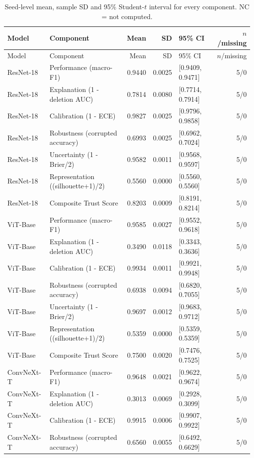 \begin{longtable}{llrrlr}
\caption{Seed-level mean, sample SD and 95\% Student-$t$ interval for every component. NC = not computed.}\label{tab:ci}\\
\toprule Model & Component & Mean & SD & 95\% CI & $n$/missing \\
\midrule\endfirsthead
\toprule Model & Component & Mean & SD & 95\% CI & $n$/missing \\
\midrule\endhead
ResNet-18 & Performance (macro-F1) & 0.9440 & 0.0025 & [0.9409, 0.9471] & 5/0 \\
ResNet-18 & Explanation (1 - deletion AUC) & 0.7814 & 0.0080 & [0.7714, 0.7914] & 5/0 \\
ResNet-18 & Calibration (1 - ECE) & 0.9827 & 0.0025 & [0.9796, 0.9858] & 5/0 \\
ResNet-18 & Robustness (corrupted accuracy) & 0.6993 & 0.0025 & [0.6962, 0.7024] & 5/0 \\
ResNet-18 & Uncertainty (1 - Brier/2) & 0.9582 & 0.0011 & [0.9568, 0.9597] & 5/0 \\
ResNet-18 & Representation ((silhouette+1)/2) & 0.5560 & 0.0000 & [0.5560, 0.5560] & 5/0 \\
ResNet-18 & Composite Trust Score & 0.8203 & 0.0009 & [0.8191, 0.8214] & 5/0 \\
ViT-Base & Performance (macro-F1) & 0.9585 & 0.0027 & [0.9552, 0.9618] & 5/0 \\
ViT-Base & Explanation (1 - deletion AUC) & 0.3490 & 0.0118 & [0.3343, 0.3636] & 5/0 \\
ViT-Base & Calibration (1 - ECE) & 0.9934 & 0.0011 & [0.9921, 0.9948] & 5/0 \\
ViT-Base & Robustness (corrupted accuracy) & 0.6938 & 0.0094 & [0.6820, 0.7055] & 5/0 \\
ViT-Base & Uncertainty (1 - Brier/2) & 0.9697 & 0.0012 & [0.9683, 0.9712] & 5/0 \\
ViT-Base & Representation ((silhouette+1)/2) & 0.5359 & 0.0000 & [0.5359, 0.5359] & 5/0 \\
ViT-Base & Composite Trust Score & 0.7500 & 0.0020 & [0.7476, 0.7525] & 5/0 \\
ConvNeXt-T & Performance (macro-F1) & 0.9648 & 0.0021 & [0.9622, 0.9674] & 5/0 \\
ConvNeXt-T & Explanation (1 - deletion AUC) & 0.3013 & 0.0069 & [0.2928, 0.3099] & 5/0 \\
ConvNeXt-T & Calibration (1 - ECE) & 0.9915 & 0.0006 & [0.9907, 0.9922] & 5/0 \\
ConvNeXt-T & Robustness (corrupted accuracy) & 0.6560 & 0.0055 & [0.6492, 0.6629] & 5/0 \\

\end{longtable}
